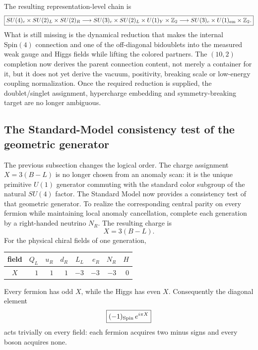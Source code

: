 \documentclass[11pt]{article}
\theoremstyle{definition}\newtheorem{definition}[theorem]{Definition}
\theoremstyle{remark}\newtheorem{remark}[theorem]{Remark}\newtheorem{conjecture}[theorem]{Conjecture}
\begin{document}
The resulting representation-level chain is
\begin{equation}\label{eq:fullbreakingchain}
 \boxed{
 SU(4)_c\times SU(2)_L\times SU(2)_R
 \longrightarrow
 SU(3)_c\times SU(2)_L\times U(1)_Y\times\mathbb Z_2
 \longrightarrow
 SU(3)_c\times U(1)_{\rm em}\times\mathbb Z_2.}
\end{equation}
What is still missing is the dynamical reduction that makes the internal $\mathrm{Spin}(4)$ connection and one of the off-diagonal bidoublets into the measured weak gauge and Higgs fields while lifting the colored partners. The $(10,2)$ completion now derives the parent connection content, not merely a container for it, but it does not yet derive the vacuum, positivity, breaking scale or low-energy coupling normalization. Once the required reduction is supplied, the doublet/singlet assignment, hypercharge embedding and symmetry-breaking target are no longer ambiguous.

\subsection{The Standard-Model consistency test of the geometric generator}\label{subsec:BLcompletion}
The previous subsection changes the logical order. The charge assignment $X=3(B-L)$ is no longer chosen from an anomaly scan: it is the unique primitive $U(1)$ generator commuting with the standard color subgroup of the natural $SU(4)$ factor. The Standard Model now provides a consistency test of that geometric generator. To realize the corresponding central parity on every fermion while maintaining local anomaly cancellation, complete each generation by a right-handed neutrino $N_R$. The resulting charge is
\begin{equation}\label{eq:XBL}
 \boxed{X=3(B-L).}
\end{equation}
For the physical chiral fields of one generation,
\begin{center}
\begin{tabular}{c|rrrrrr|r}
field & $Q_L$ & $u_R$ & $d_R$ & $L_L$ & $e_R$ & $N_R$ & $H$\\
\hline
$X$ & $1$ & $1$ & $1$ & $-3$ & $-3$ & $-3$ & $0$
\end{tabular}
\end{center}
Every fermion has odd $X$, while the Higgs has even $X$. Consequently the diagonal element
\begin{equation}\label{eq:spinBLdiag}
 \boxed{(-1)_{\rm Spin}\,e^{i\pi X}}
\end{equation}
acts trivially on every field: each fermion acquires two minus signs and every boson acquires none.
\end{document}

